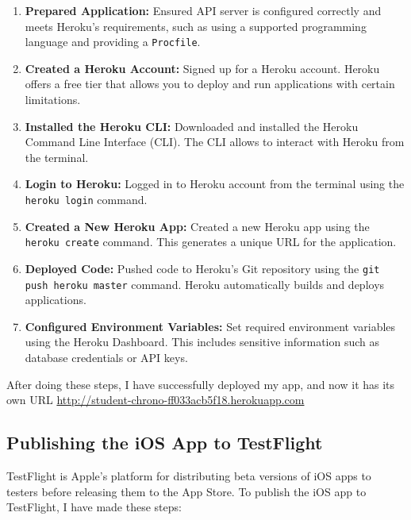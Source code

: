 \documentclass[
  biblatex,
  language=english,
  figures=false,
  sourcecodes,
  glossaries,
  index
]{kidiplom}
\begin{document}
\begin{enumerate}
    \item \textbf{Prepared Application:} Ensured API server is configured correctly and meets Heroku's requirements, such as using a supported programming language and providing a \texttt{Procfile}.
    \item \textbf{Created a Heroku Account:} Signed up for a Heroku account. Heroku offers a free tier that allows you to deploy and run applications with certain limitations.
    \item \textbf{Installed the Heroku CLI:} Downloaded and installed the Heroku Command Line Interface (CLI). The CLI allows to interact with Heroku from the terminal.
    \item \textbf{Login to Heroku:} Logged in to Heroku account from the terminal using the \texttt{heroku login} command.
    \item \textbf{Created a New Heroku App:} Created a new Heroku app using the \texttt{heroku create} command. This generates a unique URL for the application.
    \item \textbf{Deployed Code:} Pushed code to Heroku's Git repository using the \texttt{git push heroku master} command. Heroku automatically builds and deploys applications.
    
    \item \textbf{Configured Environment Variables:} Set required environment variables using the Heroku Dashboard. This includes sensitive information such as database credentials or API keys.
\end{enumerate}
After doing these steps, I have successfully deployed my app, and now it has its own URL \url{http://student-chrono-ff033acb5f18.herokuapp.com}

\subsection{Publishing the iOS App to TestFlight}

TestFlight is Apple's platform for distributing beta versions of iOS apps to testers before releasing them to the App Store. To publish the iOS app to TestFlight, I have made these steps:
\end{document}
